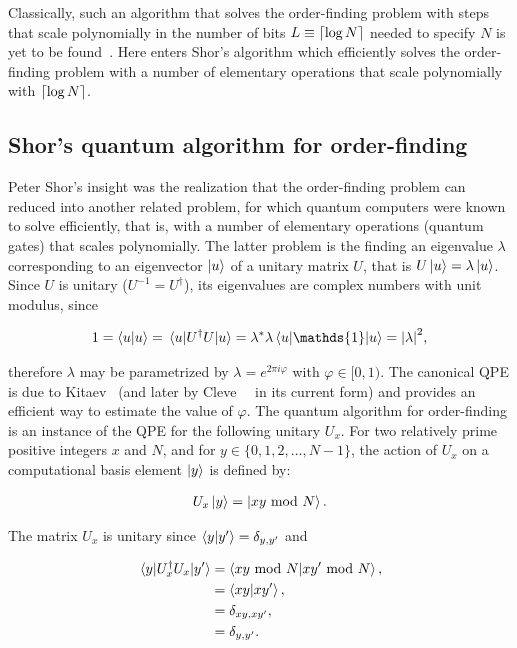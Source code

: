 \bigskip
\noindent
Classically, such an algorithm that solves the order-finding problem with steps that scale polynomially in the number of bits $L \equiv \lceil\log{N}\rceil$ needed to specify $N$ is yet to be found~\cite{Mike&Ike, Dewolf_2019}. Here enters Shor's algorithm which efficiently solves the order-finding problem with a number of elementary operations that scale polynomially with $\lceil\log{N}\rceil$.

\subsection{Shor's quantum algorithm for order-finding}

Peter Shor's insight was the realization that the order-finding problem can reduced into another related problem, for which quantum computers were known to solve efficiently, that is, with a number of elementary operations (quantum gates) that scales polynomially. The latter problem is the finding an eigenvalue $\lambda$ corresponding to an eigenvector $\ket{u}$ of a unitary matrix $U$, that is $U\ket{u} = \lambda \ket{u}$. Since $U$ is unitary ($U^{-1} = U^{\dagger}$), its eigenvalues are complex numbers with unit modulus, since

\begin{align}
	1 = \braket{u}{u} = \expval{U^{\dagger}U}{u} = \lambda^*\lambda \expval{\mathds{1}}{u} = \abs{\lambda}^2,
\end{align}

\noindent
therefore  $\lambda$ may be parametrized by $\lambda = e^{2\pi i \varphi}$ with $\varphi \in [0, 1)$. The canonical \acs{QPE} is due to Kitaev~\cite{Kitaev_1995} (and later by Cleve~\etal~\cite{Cleve_1998} in its current form) and provides an efficient way to estimate the value of $\varphi$.  The quantum algorithm for order-finding is an instance of the \acs{QPE} for the following unitary $U_x$. For two relatively prime positive integers $x$ and $N$, and for $y \in \{0, 1, 2,\ldots, N - 1\}$, the action of $U_x$ on a computational basis element $\ket{y}$ is defined by:

\begin{align}
	U_x\ket{y} = \ket{x y \text{ mod } N}.
\end{align}

\noindent
The matrix $U_x$ is unitary since $\ip{y}{y'} = \delta_{y, y'}$ and 

\begin{align}
	\matrixel{y}{U_x^{\dagger}U_x}{y'} &= \ip{xy \text{ mod } N}{xy' \text{ mod } N}, \nonumber \\
								   &= \ip{xy}{xy'}, \nonumber \\
								   &= \delta_{xy, xy'}, \nonumber \\
								   &= \delta_{y, y'}.
\end{align}

